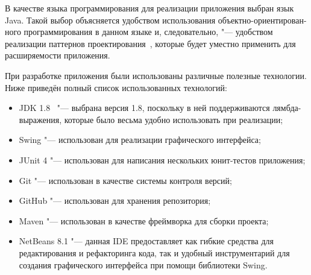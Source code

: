 В качестве языка программирования для реализации приложения выбран язык Java. Такой выбор объясняется удобством использования объектно-ориентирован-ного программирования в данном языке и, следовательно, "--- удобством реализации паттернов проектирования~\cite{gamma}, которые будет уместно применить для расширяемости приложения.

При разработке приложения были использованы различные полезные технологии. Ниже приведён полный список использованных технологий:

\begin{itemize}
\item JDK 1.8~\cite{java} "--- выбрана версия 1.8, поскольку в ней поддерживаются лямбда-выражения, которые было весьма удобно использовать при реализации;
\item Swing "--- использован для реализации графического интерфейса;
\item JUnit 4 "--- использован для написания нескольких юнит-тестов приложения;
\item Git "--- использован в качестве системы контроля версий;
\item GitHub "--- использован для хранения репозитория;
\item Maven "--- использован в качестве фреймворка для сборки проекта;
\item NetBeans 8.1 "--- данная IDE предоставляет как гибкие средства для редактирования и рефакторинга кода, так и удобный инструментарий для создания графического интерфейса при помощи библиотеки Swing.
\end{itemize}
